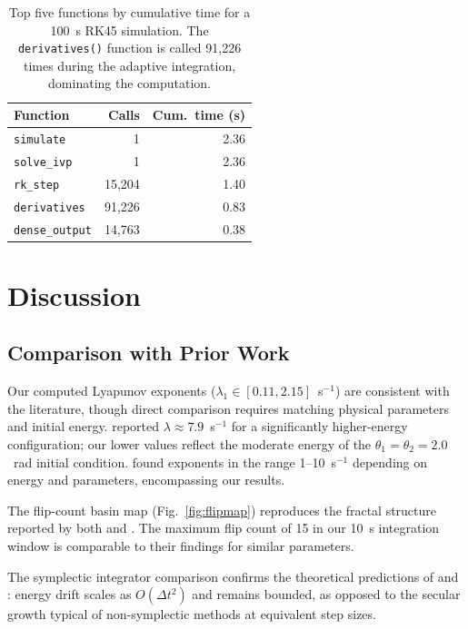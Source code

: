 \documentclass[11pt,a4paper]{article}
\newcommand{\dt}{\Delta t}
\begin{document}
\begin{table}[htbp]
\centering
\caption{Top five functions by cumulative time for a 100~s RK45 simulation.
The \texttt{derivatives()} function is called 91{,}226 times during the
adaptive integration, dominating the computation.}
\label{tab:profiling}
\begin{tabular}{@{}lrr@{}}
\toprule
\textbf{Function} & \textbf{Calls} & \textbf{Cum.\ time (s)} \\
\midrule
\texttt{simulate}            &         1 & 2.36 \\
\texttt{solve\_ivp}          &         1 & 2.36 \\
\texttt{rk\_step}            &   15{,}204 & 1.40 \\
\texttt{derivatives}         &   91{,}226 & 0.83 \\
\texttt{dense\_output}       &   14{,}763 & 0.38 \\
\bottomrule
\end{tabular}
\end{table}

\section{Discussion}\label{sec:discussion}

\subsection{Comparison with Prior Work}

Our computed Lyapunov exponents ($\lambda_1 \in [0.11, 2.15]$~s$^{-1}$) are
consistent with the literature, though direct comparison requires matching
physical parameters and initial energy. \citet{shinbrot1992chaos} reported
$\lambda \approx 7.9$~s$^{-1}$ for a significantly higher-energy configuration;
our lower values reflect the moderate energy of the $\theta_1 = \theta_2 = 2.0$~rad
initial condition. \citet{stachowiak2006numerical} found exponents in the
range 1--10~s$^{-1}$ depending on energy and parameters, encompassing our
results.

The flip-count basin map (Fig.~\ref{fig:flipmap}) reproduces the fractal
structure reported by both \citet{shinbrot1992chaos} and
\citet{stachowiak2006numerical}. The maximum flip count of 15 in our 10~s
integration window is comparable to their findings for similar parameters.

The symplectic integrator comparison confirms the theoretical predictions of
\citet{hairer2003geometric} and \citet{hairer2006geometric}: energy drift
scales as $O(\dt^2)$ and remains bounded, as opposed to the secular growth
typical of non-symplectic methods at equivalent step sizes.
\end{document}
